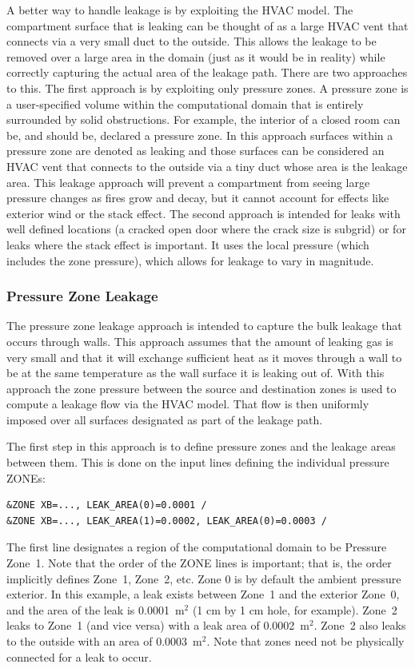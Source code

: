 \documentclass[11pt]{book}
\begin{document}
A better way to handle leakage is by exploiting the HVAC model. The compartment surface that is leaking can be thought of as a large HVAC vent that connects via a very small duct to the outside. This allows the leakage to be removed over a large area in the domain (just as it would be in reality) while correctly capturing the actual area of the leakage path. There are two approaches to this.  The first approach is by exploiting only pressure zones.  A pressure zone is a user-specified volume within the computational domain that is
entirely surrounded by solid obstructions. For example, the interior of a closed room can be, and should be, declared a pressure zone. In this approach surfaces within a pressure zone are denoted as leaking and those surfaces can be considered an HVAC vent that connects to the outside via a tiny duct whose area is the leakage area. This leakage approach will prevent a compartment from seeing large pressure changes as fires grow and decay, but it cannot account for effects like exterior wind or the stack effect. The second approach is intended for leaks with well defined locations (a cracked open door where the crack size is subgrid) or for leaks where the stack effect is important. It uses the local pressure (which includes the zone pressure), which allows for leakage to vary in magnitude.

\subsubsection{Pressure Zone Leakage}
\label{info:zone_leakage}

The pressure zone leakage approach is intended to capture the bulk leakage that occurs through walls. This approach assumes that the amount of leaking gas is very small and that it will exchange sufficient heat as it moves through a wall to be at the same temperature as the wall surface it is leaking out of. With this approach the zone pressure between the source and destination zones is used to compute a leakage flow via the HVAC model. That flow is then uniformly imposed over all surfaces designated as part of the leakage path.

The first step in this approach is to define pressure zones and the leakage areas between them.  This is done on the input lines defining the individual pressure {\ct ZONE}s:
\begin{lstlisting}
&ZONE XB=..., LEAK_AREA(0)=0.0001 /
&ZONE XB=..., LEAK_AREA(1)=0.0002, LEAK_AREA(0)=0.0003 /
\end{lstlisting}
The first line designates a region of the computational domain to be Pressure Zone~1. Note that the order of the {\ct ZONE} lines is important; that is, the order implicitly defines Zone~1, Zone~2, etc. Zone 0 is by default the ambient pressure exterior. In this example, a leak exists between Zone~1 and the exterior Zone~0, and the area of the leak is 0.0001~m$^2$ (1 cm by 1 cm hole, for example). Zone~2 leaks to Zone~1 (and vice versa) with a leak area of 0.0002~m$^2$. Zone~2 also leaks to the outside with an area of 0.0003~m$^2$. Note that zones need not be physically connected for a leak to occur.
\end{document}
